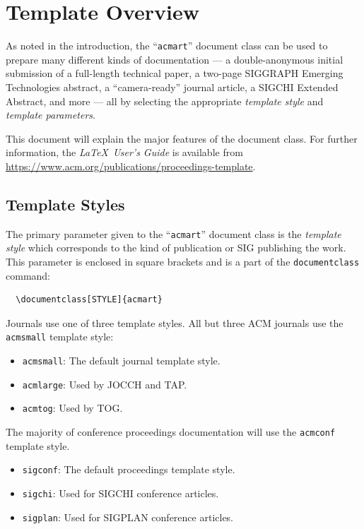 \documentclass[sigconf,review]{acmart}
\begin{document}
\section{Template Overview}
As noted in the introduction, the ``\verb|acmart|'' document class can
be used to prepare many different kinds of documentation --- a
double-anonymous initial submission of a full-length technical paper, a
two-page SIGGRAPH Emerging Technologies abstract, a ``camera-ready''
journal article, a SIGCHI Extended Abstract, and more --- all by
selecting the appropriate {\itshape template style} and {\itshape
  template parameters}.

This document will explain the major features of the document
class. For further information, the {\itshape \LaTeX\ User's Guide} is
available from
\url{https://www.acm.org/publications/proceedings-template}.

\subsection{Template Styles}

The primary parameter given to the ``\verb|acmart|'' document class is
the {\itshape template style} which corresponds to the kind of publication
or SIG publishing the work. This parameter is enclosed in square
brackets and is a part of the {\verb|documentclass|} command:
\begin{verbatim}
  \documentclass[STYLE]{acmart}
\end{verbatim}

Journals use one of three template styles. All but three ACM journals
use the {\verb|acmsmall|} template style:
\begin{itemize}
\item {\texttt{acmsmall}}: The default journal template style.
\item {\texttt{acmlarge}}: Used by JOCCH and TAP.
\item {\texttt{acmtog}}: Used by TOG.
\end{itemize}

The majority of conference proceedings documentation will use the {\verb|acmconf|} template style.
\begin{itemize}
\item {\texttt{sigconf}}: The default proceedings template style.
\item{\texttt{sigchi}}: Used for SIGCHI conference articles.
\item{\texttt{sigplan}}: Used for SIGPLAN conference articles.
\end{itemize}
\end{document}
